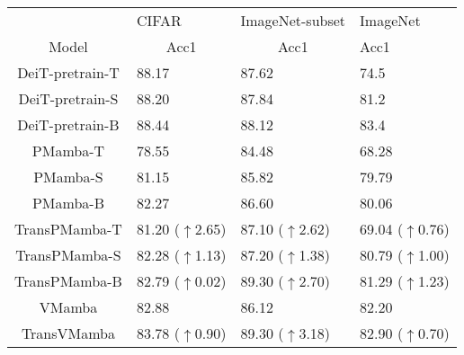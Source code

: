 \begin{table}[]
\centering
\scalebox{0.80}
{
\begin{tabular}{c|lll}
\midrule
                        & CIFAR                     & ImageNet-subset              & ImageNet \\
\multirow{-2}{*}{Model} & \multicolumn{1}{c|}{Acc1} & \multicolumn{1}{c|}{Acc1}    & Acc1     \\ \midrule
DeiT-pretrain-T         & 88.17                     & 87.62                        & 74.5     \\
DeiT-pretrain-S         & 88.20                     & 87.84                        & 81.2     \\
DeiT-pretrain-B         & 88.44                     & 88.12                        & 83.4     \\ \midrule
{\color[HTML]{808080}PMamba-T}                & {\color[HTML]{808080}78.55}                     & {\color[HTML]{808080}84.48}                        & {\color[HTML]{808080}68.28}    \\
{\color[HTML]{808080}PMamba-S}                & {\color[HTML]{808080}81.15}                     & {\color[HTML]{808080}85.82}                        &  {\color[HTML]{808080}79.79}         \\
{\color[HTML]{808080}PMamba-B}                & {\color[HTML]{808080}82.27}                     & {\color[HTML]{808080}86.60}                        &   {\color[HTML]{808080}80.06}        \\
TransPMamba-T           & 81.20 {\color[HTML]{FE0000} ($\uparrow$2.65)}                     & 87.10 {\color[HTML]{FE0000} ($\uparrow$2.62)} & 69.04 {\color[HTML]{FE0000} ($\uparrow$0.76)}    \\
TransPMamba-S           & 82.28 {\color[HTML]{FE0000} ($\uparrow$1.13)}                     & 87.20 {\color[HTML]{FE0000} ($\uparrow$1.38)}                        &   80.79 {\color[HTML]{FE0000} ($\uparrow$1.00)}         \\
TransPMamba-B           & 82.79 {\color[HTML]{FE0000} ($\uparrow$0.02)}                     & 89.30 {\color[HTML]{FE0000} ($\uparrow$2.70)}                        &   81.29 {\color[HTML]{FE0000} ($\uparrow$1.23)}      \\ \midrule
{\color[HTML]{808080}VMamba}                  & {\color[HTML]{808080}82.88}                     & {\color[HTML]{808080}86.12}                        &  {\color[HTML]{808080}82.20}        \\
TransVMamba             &        83.78 {\color[HTML]{FE0000} ($\uparrow$0.90)}                      & 89.30 {\color[HTML]{FE0000} ($\uparrow$3.18)}                        &    82.90 {\color[HTML]{FE0000} ($\uparrow$0.70)}       \\ \midrule

\end{tabular}}
\end{table}
